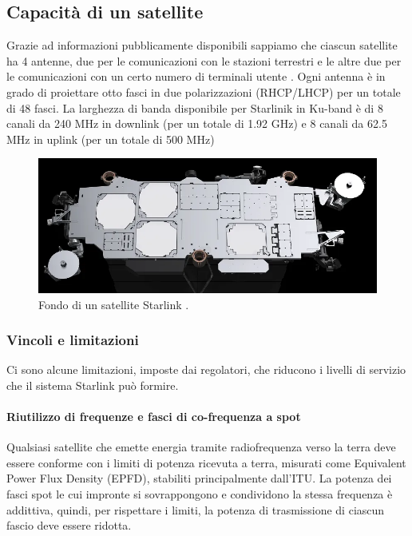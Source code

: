 \subsection{Capacità di un satellite}

Grazie ad informazioni pubblicamente disponibili sappiamo che ciascun satellite ha 4 antenne, due per le comunicazioni con le stazioni terrestri e le altre due per le comunicazioni con un certo numero di terminali utente \cite{branch_education_how_2022}.
Ogni antenna è in grado di proiettare otto fasci in due polarizzazioni (RHCP/LHCP) per un totale di 48 fasci.
La larghezza di banda disponibile per Starlinik in \ac{Ku}-band è di 8 canali da 240 MHz in downlink (per un totale di 1.92 GHz) e 8 canali da 62.5 MHz in uplink (per un totale di 500 MHz)

\begin{figure}[htbp]
  \centering
  \includegraphics[width=0.9\linewidth]{./res/img/starlink_satellite_back.png}
  \caption{Fondo di un satellite Starlink \cite{mike_puchol_modeling_2022}.}
  \label{fig:starlink-satellite}
\end{figure}

\subsubsection{Vincoli e limitazioni}
Ci sono alcune limitazioni, imposte dai regolatori, che riducono i livelli di servizio che il sistema Starlink può formire.

\paragraph{Riutilizzo di frequenze e fasci di co-frequenza a spot}
Qualsiasi satellite che emette energia tramite radiofrequenza verso la terra deve essere conforme con i limiti di potenza ricevuta a terra, misurati come Equivalent Power Flux Density (EPFD), stabiliti principalmente dall'\ac{ITU}.
La potenza dei fasci spot le cui impronte si sovrappongono e condividono la stessa frequenza è addittiva, quindi, per rispettare i limiti, la potenza di trasmissione di ciascun fascio deve essere ridotta.

